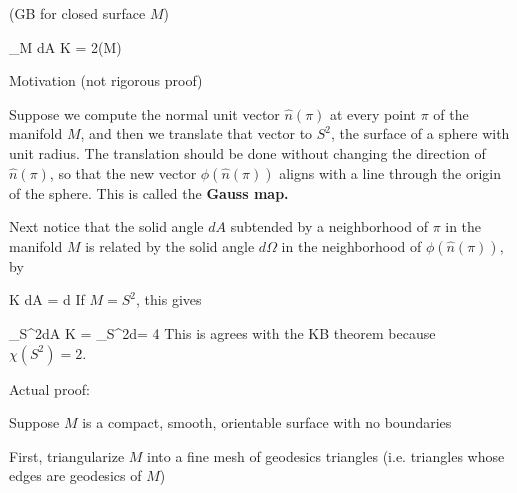 \begin{claim}(GB for closed surface $M$)

\beq
\iint_M dA \; K = 2\pi \chi(M)
\eeq
\end{claim} 
\proof
Motivation (not rigorous proof)

Suppose we compute the normal unit vector $\hat{n}(\pi)$
at every point $\pi$ of the manifold $M$, and then we translate 
that vector to $S^2$, the surface
of a sphere with unit radius.
The translation should be done without changing the direction of $\hat{n}(\pi)$, so that the
new vector $\phi(\hat{n}(\pi))$ aligns with a line through the
origin of the sphere.
This is called the {\bf Gauss map.} 

Next notice that the
solid angle $dA$ subtended by
a neighborhood of $\pi$ in the 
manifold $M$ is related by
the solid angle $d\Omega$ 
in the neighborhood of $\phi(\hat{n}(\pi))$, by

\beq
K dA = d\Omega
\eeq
If $M=S^2$, this gives

\beq
\iint_{S^2}dA\; K = \int_{S^2}d\Omega = 4\pi
\eeq
This is agrees with the KB 
theorem because $\chi(S^2)=2$.

Actual proof:

Suppose $M$ 
is a compact, smooth,
orientable surface with no boundaries

First, triangularize $M$
into a fine mesh of
geodesics triangles (i.e. triangles whose edges are 
geodesics of $M$)

